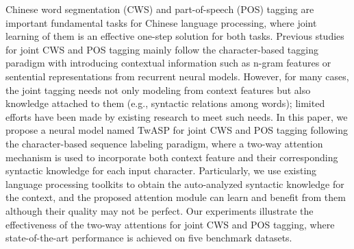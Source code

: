 Chinese word segmentation (CWS) and part-of-speech (POS) tagging are important fundamental tasks for Chinese language processing, where joint learning of them is an effective one-step solution for both tasks. Previous studies for joint CWS and POS tagging mainly follow the character-based tagging paradigm with introducing contextual information such as n-gram features or sentential representations from recurrent neural models. However, for many cases, the joint tagging needs not only modeling from context features but also knowledge attached to them (e.g., syntactic relations among words); limited efforts have been made by existing research to meet such needs. In this paper, we propose a neural model named TwASP for joint CWS and POS tagging following the character-based sequence labeling paradigm, where a two-way attention mechanism is used to incorporate both context feature and their corresponding syntactic knowledge for each input character. Particularly, we use existing language processing toolkits to obtain the auto-analyzed syntactic knowledge for the context, and the proposed attention module can learn and benefit from them although their quality may not be perfect. Our experiments illustrate the effectiveness of the two-way attentions for joint CWS and POS tagging, where state-of-the-art performance is achieved on five benchmark datasets.
